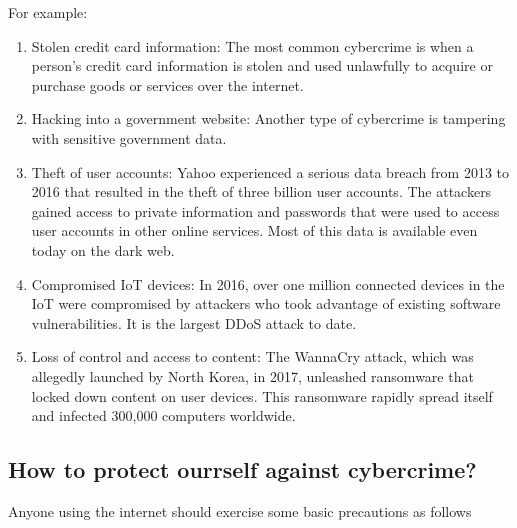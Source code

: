 \documentclass[a4paper]{article}
\begin{document}
For example:
\begin{enumerate}
  \item Stolen credit card information: The most common cybercrime is when a person’s credit card information is stolen and used unlawfully to acquire or purchase goods or services over the internet.
  \item Hacking into a government website: Another type of cybercrime is tampering with sensitive government data.
  \item Theft of user accounts: Yahoo experienced a serious data breach from 2013 to 2016  that resulted in the theft of three billion user accounts. The attackers gained access to private information and passwords that were used to access user accounts in other online services. Most of this data is available even today on the dark web.
  \item Compromised IoT devices: In 2016, over one million connected devices in the IoT were compromised by attackers who took advantage of existing software vulnerabilities. It is the largest DDoS attack to date.
  \item Loss of control and access to content: The WannaCry attack, which was allegedly launched by North Korea, in 2017, unleashed ransomware that locked down content on user devices. This ransomware rapidly spread itself and infected 300,000 computers worldwide.
\end{enumerate}
\subsection{How to protect ourrself against cybercrime?}
Anyone using the internet should exercise some basic precautions as follows
\end{document}
